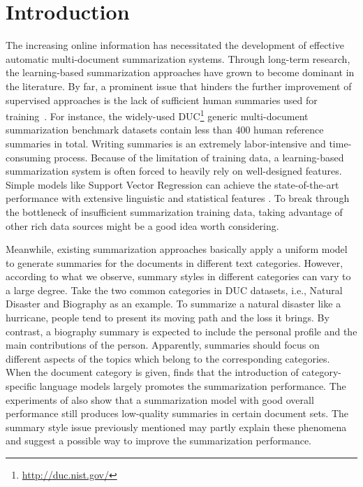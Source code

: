 \documentclass[letterpaper]{article}
\begin{document}
\section{Introduction}
The increasing online information has necessitated the development of effective automatic multi-document summarization systems.
Through long-term research, the learning-based summarization approaches have grown to become dominant in the literature.
By far, a prominent issue that hinders the further improvement of supervised approaches is the lack of sufficient human summaries used for training~\cite{ziqiang2016tgsum}.
For instance, the widely-used DUC\footnote{\url{http://duc.nist.gov/}} generic multi-document summarization benchmark datasets contain less than 400 human reference summaries in total.
Writing summaries is an extremely labor-intensive and time-consuming process.
Because of the limitation of training data, a learning-based summarization system is often forced to heavily rely on well-designed features.
Simple models like Support Vector Regression can achieve the state-of-the-art performance with extensive linguistic and statistical features \cite{hong2014improving}.
To break through the bottleneck of insufficient summarization training data, taking advantage of other rich data sources might be a good idea worth considering.

Meanwhile, existing summarization approaches basically apply a uniform model to generate summaries for the documents in different text categories.
However, according to what we observe, summary styles in different categories can vary to a large degree.
Take the two common categories in DUC datasets, i.e., Natural Disaster and Biography as an example.
To summarize a natural disaster like a hurricane, people tend to present its moving path and the loss it brings.
By contrast, a biography summary is expected to include the personal profile and the main contributions of the person.
Apparently, summaries should focus on different aspects of the topics which belong to the corresponding categories.
When the document category is given, \cite{kedzie-mckeown-diaz:2015:ACL-IJCNLP}
finds that the introduction of category-specific language models largely promotes the summarization performance.
The experiments of \cite{wan2015multi} also show that a summarization model with good overall performance still produces low-quality summaries in certain document sets.
The summary style issue previously mentioned may partly explain these phenomena and suggest a possible way to improve the summarization performance.
\end{document}
